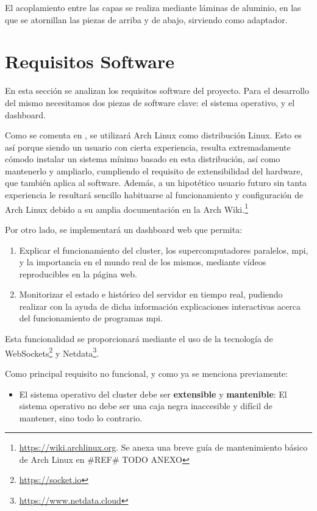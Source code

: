 El acoplamiento entre las capas se realiza mediante láminas de aluminio, en las que se atornillan las piezas de arriba y de abajo, sirviendo como adaptador.


\section{Requisitos Software}
\label{sec:requisitos_software}
En esta sección se analizan los requisitos software del proyecto. Para el desarrollo del mismo necesitamos dos piezas de software clave: el sistema operativo, y el dashboard.

Como se comenta en , se utilizará Arch Linux como distribución Linux. Esto es así porque siendo un usuario con cierta experiencia, resulta extremadamente cómodo instalar un sistema mínimo basado en esta distribución, así como mantenerlo y ampliarlo, cumpliendo el requisito de extensibilidad del hardware, que también aplica al software. Además, a un hipotético usuario futuro sin tanta experiencia le resultará sencillo habituarse al funcionamiento y configuración de Arch Linux debido a su amplia documentación en la Arch Wiki.\footnote{\url{https://wiki.archlinux.org}. Se anexa una breve guía de mantenimiento básico de Arch Linux en \#REF\# TODO ANEXO}

Por otro lado, se implementará un dashboard web que permita:
\begin{enumerate}
    \item Explicar el funcionamiento del cluster, los supercomputadores paralelos, \acrshort{mpi}, y la importancia en el mundo real de los mismos, mediante vídeos reproducibles en la página web.
    \item Monitorizar el estado e histórico del servidor en tiempo real, pudiendo realizar con la ayuda de dicha información explicaciones interactivas acerca del funcionamiento de programas \acrshort{mpi}.
\end{enumerate}

Esta funcionalidad se proporcionará mediante el uso de la tecnología de WebSockets\footnote{\url{https://socket.io}} y Netdata\footnote{\url{https://www.netdata.cloud}}.

Como principal requisito no funcional, y como ya se menciona previamente:
\begin{itemize}
    \item El sistema operativo del cluster debe ser \textbf{extensible} y \textbf{mantenible}: El sistema operativo no debe ser una caja negra inaccesible y difícil de mantener, sino todo lo contrario.
\end{itemize}
